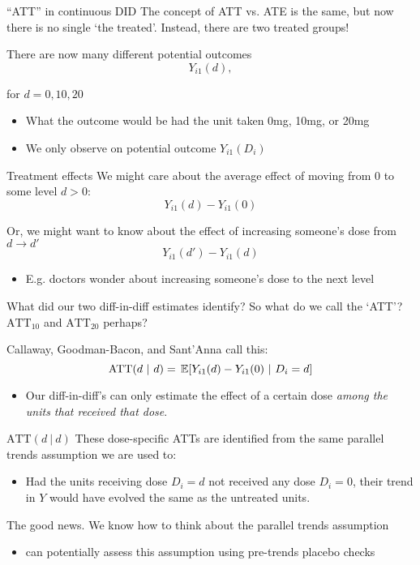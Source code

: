 \documentclass[aspectratio=43,t]{beamer}
\begin{document}
\begin{frame}{``ATT'' in continuous DID}
  The concept of ATT vs. ATE is the same, but now there is no single `the treated'. Instead, there are two treated groups!

  There are now many different potential outcomes
  $$
    Y_{i1}(d),
  $$

  for $d = 0, 10, 20$
  \begin{itemize}
    \item What the outcome would be had the unit taken 0mg, 10mg, or 20mg

    \item We only observe on potential outcome $Y_{i1}(D_i)$
  \end{itemize}
\end{frame}

\begin{frame}{Treatment effects}
  We might care about the average effect of moving from 0 to some level $d > 0$:
  $$
    Y_{i1}(d) - Y_{i1}(0)
  $$

  \bigskip
  Or, we might want to know about the effect of increasing someone's dose from $d \to d'$
  $$
    Y_{i1}(d') - Y_{i1}(d)
  $$

  \begin{itemize}
    \item E.g. doctors wonder about increasing someone's dose to the next level
  \end{itemize}
\end{frame}

\begin{frame}{What did our two diff-in-diff estimates identify?}
  So what do we call the `ATT'? $\text{ATT}_{10}$ and $\text{ATT}_{20}$ perhaps?

  \bigskip\bigskip
  Callaway, Goodman-Bacon, and Sant'Anna call this:
  $$
    \text{ATT}(d \ \vert \ d) = \expec{Y_{i1}(d) - Y_{i1}(0)}{D_i = d}
  $$

  \begin{itemize}
    \item Our diff-in-diff's can only estimate the effect of a certain dose \emph{among the units that received that dose}.
  \end{itemize}
\end{frame}

\begin{frame}{$\text{ATT}(d \ \vert \ d)$}
  These dose-specific ATTs are identified from the same parallel trends assumption we are used to:
  \begin{itemize}
    \item Had the units receiving dose $D_i = d$ not received any dose $D_i = 0$, their trend in $Y$ would have evolved the same as the untreated units.
  \end{itemize}

  \bigskip
  The good news. We know how to think about the parallel trends assumption
  \begin{itemize}
    \item can potentially assess this assumption using pre-trends placebo checks
  \end{itemize}
\end{frame}
\end{document}
